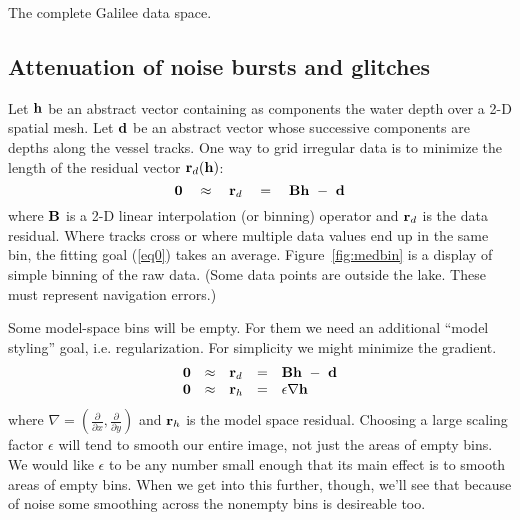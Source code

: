  {
  The complete Galilee data space.}


\subsection{Attenuation of noise bursts and glitches}


Let $\bold{h}$ be an abstract vector containing as components
the water depth over a 2-D spatial mesh.
Let $\bold{d}$ be an abstract vector whose successive components
are depths along the vessel tracks.
One way to grid irregular data is to minimize the length 
of the residual vector $\bold r_d(\bold h)$:
\begin{equation}
	\bold 0 \quad\approx\quad \bold r_d \quad=\quad \bold B \bold h \ -\  \bold d    \label{eq0}
\end{equation}
where $\bold B$ is a 2-D linear interpolation (or binning) operator 
and $\bold r_d$ is the data residual.
Where tracks cross or where multiple data values end up in the same bin,
the fitting goal (\ref{eq0}) takes an average.
Figure~\ref{fig:medbin}
is a display of simple binning of the raw data.
(Some data points are outside the lake.
These must represent navigation errors.)


\par

Some model-space bins will be empty.
For them we need an additional ``model styling'' goal,
i.e. regularization.
For simplicity we might minimize the gradient.
\begin{equation}
  \begin{array}{lllll}
    \bold 0 &\approx& \bold r_d &=& \bold B \bold h \ -\  \bold d \\
    \bold 0 &\approx& \bold r_h &=& \epsilon \nabla \bold h 
  \end{array} \label{eq1}
\end{equation}
where $\nabla=\left ( \frac{\partial}{\partial x},
\frac{\partial}{\partial y}\right)$ and $\bold r_h$ is the model space
residual.
Choosing a large scaling factor $\epsilon$ will tend to smooth
our entire image, not just the areas of empty bins.
We would like $\epsilon$ to be any number small enough
that its main effect is to smooth areas of empty bins.
When we get into this further, though, we'll see that
because of noise
some smoothing across the nonempty bins is desireable too.


